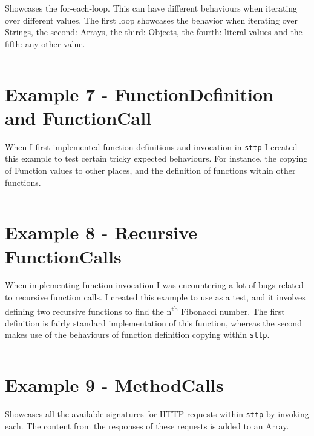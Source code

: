 \documentclass[]{full}
\theoremstyle{definition}
\begin{document}
Showcases the for-each-loop. This can have different behaviours when iterating over different values. The first loop showcases the behavior when iterating over Strings, the second: Arrays, the third: Objects, the fourth: literal values and the fifth: any other value.

\inputminted[autogobble, breaklines, tabsize=4]{text}{../../src/_examples/example_06/example_06.sttp}

\section{Example 7 - FunctionDefinition and FunctionCall}
\label{appendix:sttp-examples-7}

When I first implemented function definitions and invocation in \verb|sttp| I created this example to test certain tricky expected behaviours. For instance, the copying of Function values to other places, and the definition of functions within other functions.

\inputminted[autogobble, breaklines, tabsize=4]{text}{../../src/_examples/example_07/example_07.sttp}

\section{Example 8 - Recursive FunctionCalls}
\label{appendix:sttp-examples-8}

When implementing function invocation I was encountering a lot of bugs related to recursive function calls. I created this example to use as a test, and it involves defining two recursive functions to find the n\textsuperscript{th} Fibonacci number. The first definition is fairly standard implementation of this function, whereas the second makes use of the behaviours of function definition copying within \verb|sttp|.

\inputminted[autogobble, breaklines, tabsize=4]{text}{../../src/_examples/example_08/example_08.sttp}

\section{Example 9 - MethodCalls}
\label{appendix:sttp-examples-9}

Showcases all the available signatures for HTTP requests within \verb|sttp| by invoking each. The content from the responses of these requests is added to an Array.

\inputminted[autogobble, breaklines, tabsize=4]{text}{../../src/_examples/example_09/example_09.sttp}
\end{document}
